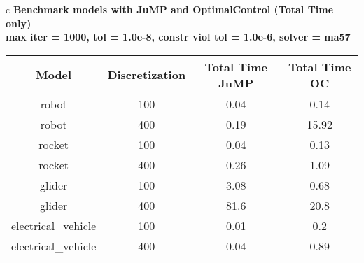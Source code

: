 \documentclass{standalone}
\begin{document}
\begin{tabular}{c}
\Large\textbf{Benchmark models with JuMP and OptimalControl (Total Time only)}\\
\large\textbf{max iter = 1000, tol = 1.0e-8, constr viol tol = 1.0e-6, solver = ma57}\\
\begin{tabular}{cccc}
  \hline
  \textbf{Model} & \textbf{Discretization} & \textbf{Total Time JuMP} & \textbf{Total Time OC} \\\hline
  robot & 100 & 0.04 & 0.14 \\
  robot & 400 & 0.19 & 15.92 \\
  rocket & 100 & 0.04 & 0.13 \\
  rocket & 400 & 0.26 & 1.09 \\
  glider & 100 & 3.08 & 0.68 \\
  glider & 400 & 81.6 & 20.8 \\
  electrical\_vehicle & 100 & 0.01 & 0.2 \\
  electrical\_vehicle & 400 & 0.04 & 0.89 \\\hline
\end{tabular}
\end{tabular}
\end{document}
